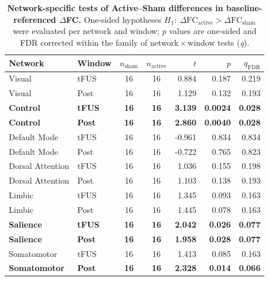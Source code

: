     \begin{table}[t]
        \centering
        \caption{\textbf{Network-specific tests of Active--Sham differences in baseline-referenced $\Delta$FC.}
        One-sided hypotheses $H_1:\ \Delta\mathrm{FC}_{\text{active}}>\Delta\mathrm{FC}_{\text{sham}}$ were evaluated per network and window; $p$ values are one-sided and FDR corrected within the family of network\,$\times$\,window tests (\emph{q}). }
        \label{tab:network_specificity_onesided}
        \setlength{\tabcolsep}{6pt}
        \begin{tabular}{l l c c r r r}
        \toprule
        Network & Window & $n_{\mathrm{sham}}$ & $n_{\mathrm{active}}$ & $t$ & $p$ & $q_{\mathrm{FDR}}$ \\
        \midrule
        Visual           & tFUS & 16 & 16 &  0.884 & 0.187 & 0.219 \\
        Visual           & Post & 16 & 16 &  1.129 & 0.132 & 0.193 \\
        \textbf{Control}          & \textbf{tFUS} & \textbf{16} & \textbf{16} &  \textbf{3.139} & \textbf{0.0024} & \textbf{0.028} \\
        \textbf{Control}          & \textbf{Post} & \textbf{16} & \textbf{16} &  \textbf{2.860} & \textbf{0.0040} & \textbf{0.028} \\
        Default Mode     & tFUS & 16 & 16 & -0.961 & 0.834 & 0.834 \\
        Default Mode     & Post & 16 & 16 & -0.722 & 0.765 & 0.823 \\
        Dorsal Attention & tFUS & 16 & 16 &  1.036 & 0.155 & 0.198 \\
        Dorsal Attention & Post & 16 & 16 &  1.103 & 0.138 & 0.193 \\
        Limbic           & tFUS & 16 & 16 &  1.345 & 0.093 & 0.163 \\
        Limbic           & Post & 16 & 16 &  1.445 & 0.078 & 0.163 \\
        \textbf{Salience}         & \textbf{tFUS} & \textbf{16} & \textbf{16} &  \textbf{2.042} & \textbf{0.026} & \textbf{0.077}\\
        \textbf{Salience}         & \textbf{Post} & \textbf{16} & \textbf{16} &  \textbf{1.958} & \textbf{0.028} & \textbf{0.077}\\
        Somatomotor    & tFUS & 16 & 16 &  1.413 & 0.085 & 0.163 \\
        \textbf{Somatomotor}      & \textbf{Post} & \textbf{16} & \textbf{16} &  \textbf{2.328} & \textbf{0.014} & \textbf{0.066} \\
        \bottomrule
        \end{tabular}
        \end{table}



